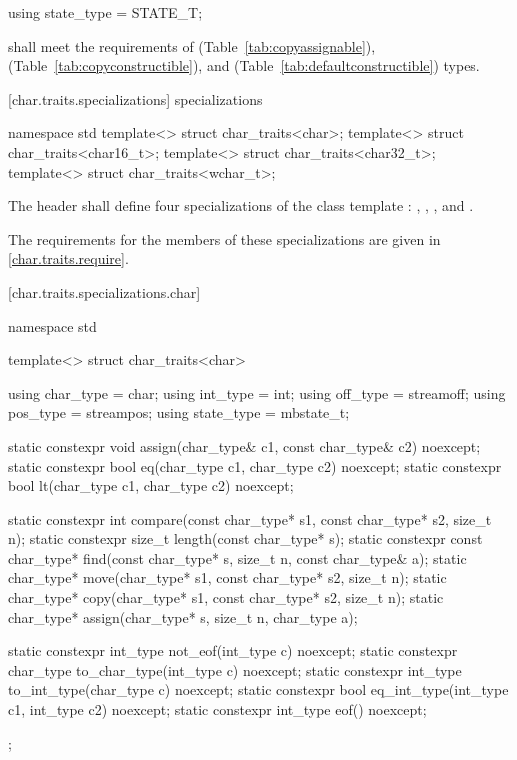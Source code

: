 %
\begin{itemdecl}
using state_type = STATE_T;
\end{itemdecl}

\begin{itemdescr}
\pnum
\requires
{}
shall meet the requirements of
 (Table~\ref{tab:copyassignable}),
 (Table~\ref{tab:copyconstructible}), and
 (Table~\ref{tab:defaultconstructible}) types.
\end{itemdescr}

[char.traits.specializations]{ specializations}

%
\begin{codeblock}
namespace std {
  template<> struct char_traits<char>;
  template<> struct char_traits<char16_t>;
  template<> struct char_traits<char32_t>;
  template<> struct char_traits<wchar_t>;
}
\end{codeblock}

\pnum
The header
shall define four
specializations of the class template
:
,
,
,
and
.

\pnum
The requirements for the members of these specializations are given in
\ref{char.traits.require}.

[char.traits.specializations.char]{}

%
\begin{codeblock}
namespace std {
  template<> struct char_traits<char> {
    using char_type  = char;
    using int_type   = int;
    using off_type   = streamoff;
    using pos_type   = streampos;
    using state_type = mbstate_t;

    static constexpr void assign(char_type& c1, const char_type& c2) noexcept;
    static constexpr bool eq(char_type c1, char_type c2) noexcept;
    static constexpr bool lt(char_type c1, char_type c2) noexcept;

    static constexpr int compare(const char_type* s1, const char_type* s2, size_t n);
    static constexpr size_t length(const char_type* s);
    static constexpr const char_type* find(const char_type* s, size_t n,
                                           const char_type& a);
    static char_type* move(char_type* s1, const char_type* s2, size_t n);
    static char_type* copy(char_type* s1, const char_type* s2, size_t n);
    static char_type* assign(char_type* s, size_t n, char_type a);

    static constexpr int_type not_eof(int_type c) noexcept;
    static constexpr char_type to_char_type(int_type c) noexcept;
    static constexpr int_type to_int_type(char_type c) noexcept;
    static constexpr bool eq_int_type(int_type c1, int_type c2) noexcept;
    static constexpr int_type eof() noexcept;
  };
}
\end{codeblock}


